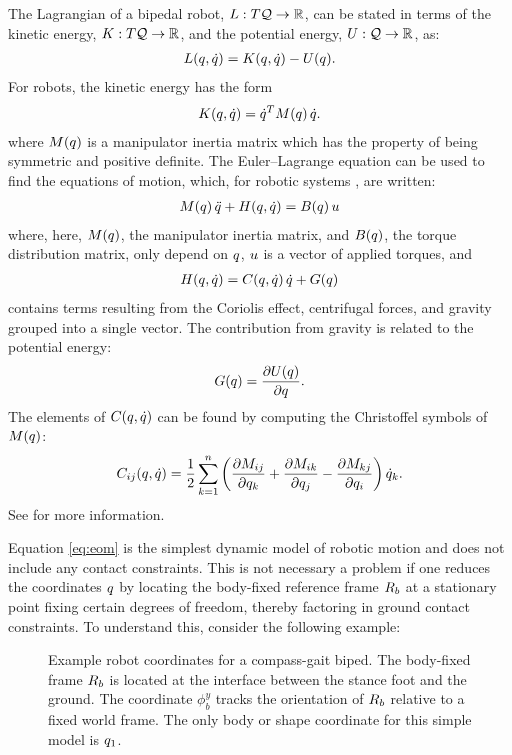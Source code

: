 The Lagrangian of a bipedal robot, $L : T\mathcal{Q} \to \mathbb{R}$, can be stated in terms
of the kinetic energy, $K : T\mathcal{Q} \to \mathbb{R}$, and the potential energy, $U : \mathcal{Q} \to
\mathbb{R}$, as:
%
\begin{align*}
  L(q, \dot{q}) = K(q, \dot{q}) - U(q).
\end{align*}
%
For robots, the kinetic energy has the form
\begin{align*}
  K(q, \dot{q}) = \dot{q}^{T} M(q) \, \dot{q}.
\end{align*}
where $M(q)$ is a manipulator inertia matrix which has the property of
being symmetric and positive definite.
%
The Euler--Lagrange equation can be used to find the equations of motion, which,
for robotic systems \cite[pp.~171]{Murray1994}, are written:
%
\begin{align}
  \label{eq:eom}
  M(q) \, \ddot{q} + H(q, \dot{q}) = B(q) \, u
\end{align}
%
where, here, $M(q)$, the manipulator inertia matrix, and $B(q)$, the
torque distribution matrix, only depend on $q$, $u$ is a vector of applied
torques, and
\begin{align*}
  H(q, \dot{q}) = C(q, \dot{q}) \, \dot{q} + G(q)
\end{align*}
contains terms resulting from the Coriolis effect, centrifugal forces, and
gravity grouped into a single vector.
%
The contribution from gravity is related to the potential energy:
\begin{align*}
  G(q) = \frac{\partial{U(q)}}{\partial{q}}.
\end{align*}
%
The elements of $C(q, \dot{q})$ can be found by computing the Christoffel
symbols of $M(q)$:
\begin{align*}
  C_{ij}(q, \dot{q}) = \frac{1}{2} \sum_{k = 1}^{n} \left( \frac{\partial{M_{ij}}}{\partial{q_{k}}} +
    \frac{\partial{M_{ik}}}{\partial{q_{j}}} - \frac{\partial{M_{kj}}}{\partial{q_{i}}} \right) \dot{q}_{k}.
\end{align*}
%
See \cite[pp.~170]{Murray1994} for more information.

Equation \eqref{eq:eom} is the simplest dynamic model of robotic motion and does
not include any contact constraints.
% 
This is not necessary a problem if one reduces the coordinates $q$ by locating
the body-fixed reference frame $R_{b}$ at a stationary point fixing certain
degrees of freedom, thereby factoring in ground contact constraints.
%
To understand this, consider the following example:

\begin{figure}[t!]
  \centering
  \def\svgwidth{.5\columnwidth}
  
  \caption[Example robot coordinates for a compass-gait biped.]{Example robot
    coordinates for a compass-gait biped.
    The body-fixed frame $R_{b}$ is located at the interface between the stance
    foot and the ground.
    The coordinate $\phi_{b}^{y}$ tracks the orientation of $R_{b}$ relative to
    a fixed world frame.
    The only body or shape coordinate for this simple model is $q_{1}$.}
    \label{fig:compass_gait_reduced_coordinates}
\end{figure}

